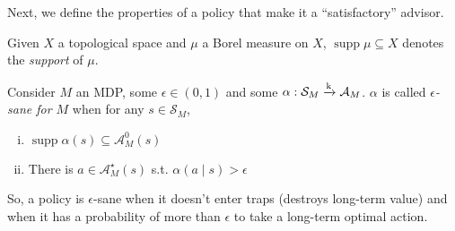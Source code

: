 \documentclass[anon,12pt]{colt2018} %
\DeclareMathOperator{\Supp}{supp}
\newcommand{\AP}[1]{\left(#1\right)}
\newcommand{\K}{\xrightarrow{\textnormal{k}}}
\newcommand{\A}{\mathcal{A}}
\newcommand{\St}{\mathcal{S}}
\newcommand{\Ad}{\alpha}
\begin{document}
Next, we define the properties of a policy that make it a \enquote{satisfactory} advisor.

Given $X$ a topological space and $\mu$ a Borel measure on $X$, $\Supp{\mu} \subseteq X$ denotes the \emph{support} of $\mu$.

\begin{samepage}
\begin{definition}
\label{def:sane}

Consider $M$ an MDP, some $\epsilon\in(0,1)$ and some $\Ad: \St_M \K \A_M$. $\Ad$ is called \emph{$\epsilon$-sane for $M$} when for any $s \in \St_M$,

\begin{enumerate}[i.]
\item\label{con:def__sane__safe} $\Supp{\Ad(s)} \subseteq \A_M^0\AP{s}$
\item\label{con:def__sane__bold} There is $a \in \A_M^\star(s)$ s.t. $\Ad(a \mid s) > \epsilon$
\end{enumerate}

So, a policy is $\epsilon$-sane when it doesn't enter traps (destroys long-term value) and when it has a probability of more than $\epsilon$ to take a long-term optimal action.

\end{definition}
\end{samepage}
\end{document}
